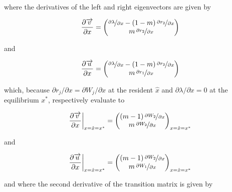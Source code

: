where the derivatives of the left and right eigenvectors are given by

\begin{equation}
    \frac{\partial \overrightarrow{v}}{\partial x} = 
    \begin{pmatrix}
        \nicefrac{\partial \lambda}{\partial x} - (1-m)\,\nicefrac{\partial r_2}{\partial x}\\
        m\,\nicefrac{\partial r_2}{\partial x}
    \end{pmatrix}
\end{equation}

and

\begin{equation}
    \frac{\partial \overrightarrow{u}}{\partial x} = 
    \begin{pmatrix}
        \nicefrac{\partial \lambda}{\partial x} - (1-m)\,\nicefrac{\partial r_2}{\partial x}\\
        m\,\nicefrac{\partial r_1}{\partial x}
    \end{pmatrix}
\end{equation}

which, because $\partial r_j / \partial x = \partial W_j / \partial x$ at the resident $\hat x$ and $\partial \lambda / \partial x = 0$ at the equilibrium $x^*$, respectively evaluate to

\begin{equation}
    \frac{\partial \overrightarrow{v}}{\partial x}\bigg|_{x=\hat x=x^*} = 
    \begin{pmatrix}
        (m-1)\,\nicefrac{\partial W_2}{\partial x}\\
        m\,\nicefrac{\partial W_2}{\partial x}
    \end{pmatrix}
    _{x=\hat x=x^*}
\end{equation}

and

\begin{equation}
    \frac{\partial \overrightarrow{u}}{\partial x}\bigg|_{x=\hat x=x^*} = 
    \begin{pmatrix}
        (m-1)\,\nicefrac{\partial W_2}{\partial x}\\
        m\,\nicefrac{\partial W_1}{\partial x}
    \end{pmatrix}
    _{x=\hat x=x^*}
    \label{eq:right_eigenvector_equilibrium}
\end{equation}

and where the second derivative of the transition matrix is given by 

